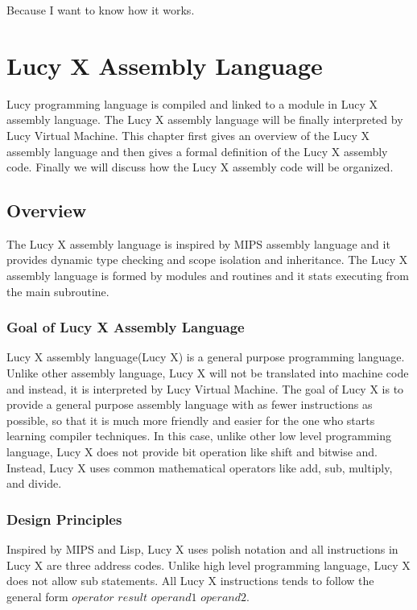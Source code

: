 \begin{savequote}[75mm]
Because I want to know how it works.
\end{savequote}

\chapter{Lucy X Assembly Language}
Lucy programming language is compiled and linked to a module in Lucy X assembly language. The Lucy X assembly language will be finally interpreted by Lucy Virtual Machine. This chapter first gives an overview of the Lucy X assembly language and then gives a formal definition of the Lucy X assembly code. Finally we will discuss how the Lucy X assembly code will be organized.

\section{Overview}
The Lucy X assembly language is inspired by MIPS assembly language and it provides dynamic type checking and scope isolation and inheritance. The Lucy X assembly language is formed by modules and routines and it stats executing from the main subroutine.

\subsection{Goal of Lucy X Assembly Language}
Lucy X assembly language(Lucy X) is a general purpose programming language. Unlike other assembly language, Lucy X will not be translated into machine code and instead, it is interpreted by Lucy Virtual Machine. The goal of Lucy X is to provide a general purpose assembly language with as fewer instructions as possible, so that it is much more friendly and easier for the one who starts learning compiler techniques. In this case, unlike other low level programming language, Lucy X does not provide bit operation like shift and bitwise and. Instead, Lucy X uses common mathematical operators like add, sub, multiply, and divide.

\subsection{Design Principles}
Inspired by MIPS and Lisp, Lucy X uses polish notation and all instructions in Lucy X are three address codes. Unlike high level programming language, Lucy X does not allow sub statements. All Lucy X instructions tends to follow the general form $operator$ $result$ $operand1$ $operand2$.

